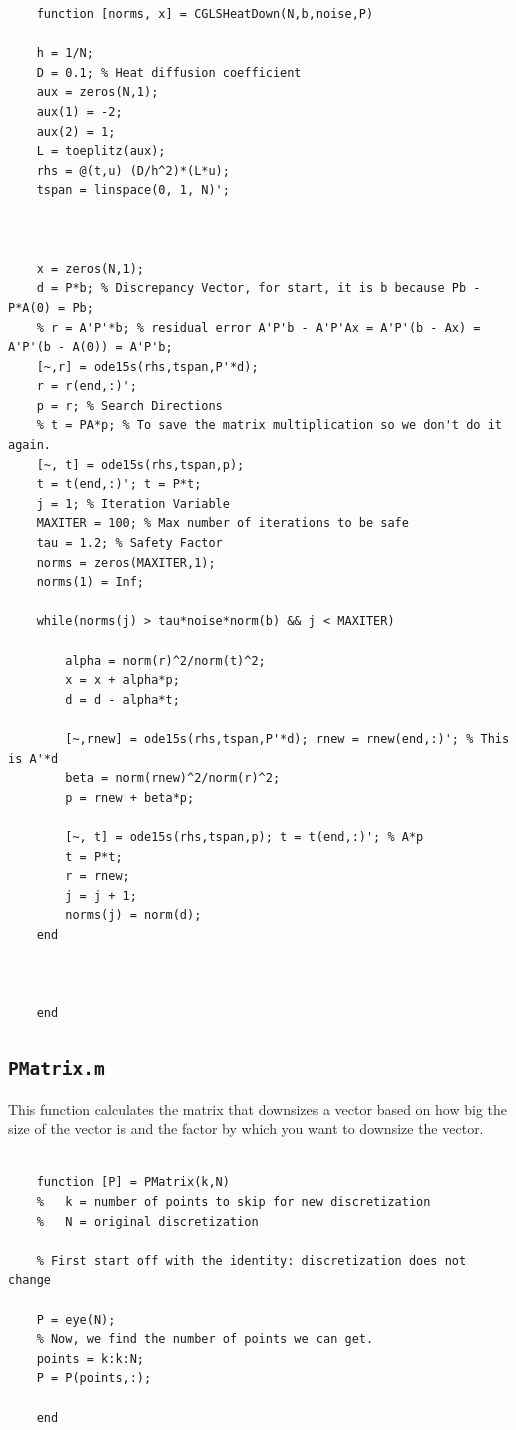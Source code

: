 \documentclass{article}
\begin{document}
\begin{verbatim}
    function [norms, x] = CGLSHeatDown(N,b,noise,P)

    h = 1/N;
    D = 0.1; % Heat diffusion coefficient
    aux = zeros(N,1);
    aux(1) = -2;
    aux(2) = 1;
    L = toeplitz(aux);
    rhs = @(t,u) (D/h^2)*(L*u);
    tspan = linspace(0, 1, N)';



    x = zeros(N,1);
    d = P*b; % Discrepancy Vector, for start, it is b because Pb - P*A(0) = Pb;
    % r = A'P'*b; % residual error A'P'b - A'P'Ax = A'P'(b - Ax) = A'P'(b - A(0)) = A'P'b;
    [~,r] = ode15s(rhs,tspan,P'*d);
    r = r(end,:)';
    p = r; % Search Directions
    % t = PA*p; % To save the matrix multiplication so we don't do it again.
    [~, t] = ode15s(rhs,tspan,p);
    t = t(end,:)'; t = P*t;
    j = 1; % Iteration Variable
    MAXITER = 100; % Max number of iterations to be safe
    tau = 1.2; % Safety Factor
    norms = zeros(MAXITER,1);
    norms(1) = Inf;

    while(norms(j) > tau*noise*norm(b) && j < MAXITER)

        alpha = norm(r)^2/norm(t)^2;
        x = x + alpha*p;
        d = d - alpha*t;

        [~,rnew] = ode15s(rhs,tspan,P'*d); rnew = rnew(end,:)'; % This is A'*d
        beta = norm(rnew)^2/norm(r)^2;
        p = rnew + beta*p;

        [~, t] = ode15s(rhs,tspan,p); t = t(end,:)'; % A*p
        t = P*t;
        r = rnew;
        j = j + 1;
        norms(j) = norm(d);
    end



    end
\end{verbatim}

\subsection{\texttt{PMatrix.m}}

This function calculates the matrix that downsizes a vector based on how big the size of the vector is and the factor by which you want to downsize the vector.

\begin{verbatim}

    function [P] = PMatrix(k,N)
    %   k = number of points to skip for new discretization
    %   N = original discretization

    % First start off with the identity: discretization does not change

    P = eye(N);
    % Now, we find the number of points we can get.
    points = k:k:N;
    P = P(points,:);

    end


\end{verbatim}
\end{document}
